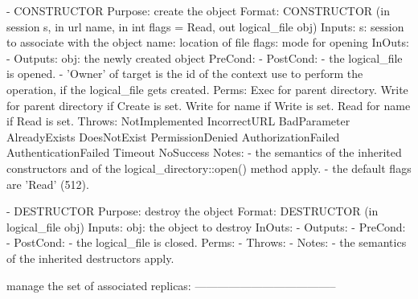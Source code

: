  \begin{myspec}
    - CONSTRUCTOR
      Purpose:  create the object
      Format:   CONSTRUCTOR      (in session    s,
                                  in  url       name,
                                  in  int       flags = Read,
                                  out logical_file  obj)
      Inputs:   s:                session to associate with
                                  the object
                name:             location of file
                flags:            mode for opening
      InOuts:   -
      Outputs:  obj:              the newly created object
      PreCond:  -
      PostCond: - the logical_file is opened.
                - 'Owner' of target is the id of the context
                  use to perform the operation, if the
                  logical_file gets created.
      Perms:    Exec  for parent directory.
                Write for parent directory if Create is set.
                Write for name if Write is set.
                Read  for name if Read  is set.
      Throws:   NotImplemented
                IncorrectURL
                BadParameter
                AlreadyExists
                DoesNotExist
                PermissionDenied
                AuthorizationFailed
                AuthenticationFailed
                Timeout
                NoSuccess
      Notes:    - the semantics of the inherited constructors
                  and of the logical_directory::open() method 
                  apply.
                - the default flags are 'Read' (512).
 
 
    - DESTRUCTOR
      Purpose:  destroy the object
      Format:   DESTRUCTOR       (in  logical_file   obj)
      Inputs:   obj:              the object to destroy
      InOuts:   -
      Outputs:  -
      PreCond:  -
      PostCond: - the logical_file is closed.
      Perms:    -
      Throws:   -
      Notes:    - the semantics of the inherited destructors
                  apply.
 
 
      manage the set of associated replicas:
      --------------------------------------
 

\end{myspec}
